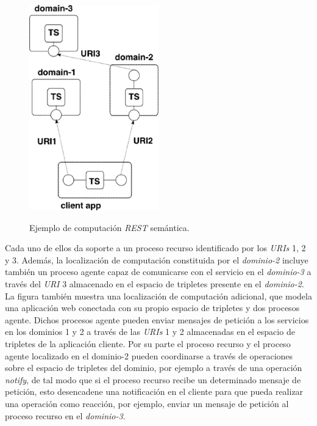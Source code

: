 \begin{figure}
\vspace{2.4in}
\centering
\caption{Ejemplo de computaci\'on \textit{REST} sem\'antica.}
\vspace{5mm}
\includegraphics[width=0.5\textwidth]{figura1}
\label{figura1}
\end{figure}

Cada uno de ellos da soporte a un proceso recurso identificado por los \textit{URIs} 1, 2 y 3. Adem\'as, la localizaci\'on de computaci\'on constituida por el \textit{dominio-2} incluye tambi\'en un proceso agente capaz de comunicarse con el servicio en el \textit{dominio-3} a trav\'es del \textit{URI} 3 almacenado en el espacio de tripletes presente en el \textit{dominio-2}. La figura tambi\'en muestra una localizaci\'on de computaci\'on adicional, que modela una aplicaci\'on web conectada con su propio espacio de tripletes y dos procesos agente. Dichos procesos agente pueden enviar mensajes de petici\'on a los servicios en los dominios 1 y 2 a trav\'es de las \textit{URIs} 1 y 2 almacenadas en el espacio de tripletes de la aplicaci\'on cliente. Por su parte el proceso recurso y el proceso agente localizado en el dominio-2 pueden coordinarse a trav\'es de operaciones sobre el espacio de tripletes del dominio,  por ejemplo a trav\'es de una operaci\'on \textit{notify}, de tal modo que si el proceso recurso recibe un determinado mensaje de petici\'on, esto desencadene una notificaci\'on en el cliente para que pueda realizar una operaci\'on como reacci\'on, por ejemplo, enviar un mensaje de petici\'on al proceso recurso en el \textit{dominio-3}.

